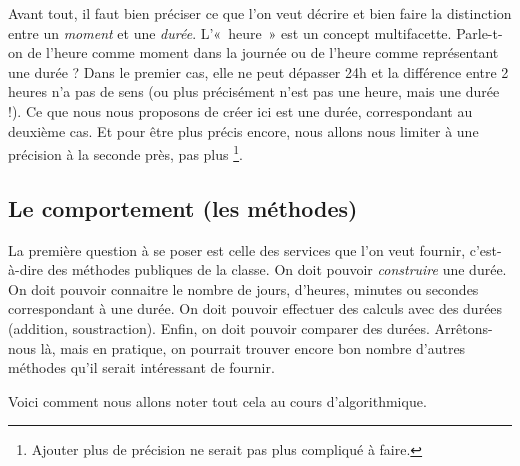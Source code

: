		Avant tout, il faut bien préciser ce que l’on veut décrire
		et bien faire la distinction entre un \emph{moment} et une \emph{durée}.
		L’«~heure~» est un concept multifacette. 
		Parle-t-on de l’heure comme moment dans la journée 
		ou de l’heure comme représentant une durée ? 
		Dans le premier cas, elle ne peut dépasser 24h 
		et la différence entre 2 heures n’a pas de sens 
		(ou plus précisément n’est pas une heure, mais une durée !).
		Ce que nous nous proposons de créer ici est une durée,
		correspondant au deuxième cas.
		Et pour être plus précis encore,
		nous allons nous limiter à une précision à la seconde près,
		pas plus%
		\footnote{%
			Ajouter plus de précision ne serait pas plus compliqué à faire.%
		}.
	
	\subsection{Le comportement (les méthodes)}
	
		La première question à se poser est celle des services que l’on veut
		fournir, c’est-à-dire des méthodes publiques de la classe. On doit
		pouvoir \textit{construire} une durée. On doit pouvoir connaitre le
		nombre de jours, d’heures, minutes ou secondes correspondant à une durée. On doit
		pouvoir effectuer des calculs avec des durées (addition, soustraction).
		Enfin, on doit pouvoir comparer des durées. Arrêtons-nous là, mais en
		pratique, on pourrait trouver encore bon nombre d’autres méthodes qu’il
		serait intéressant de fournir. 
		
		Voici comment nous allons noter tout cela au cours d'algorithmique.
		
		\begin{algo}
		\end{algo}
		
